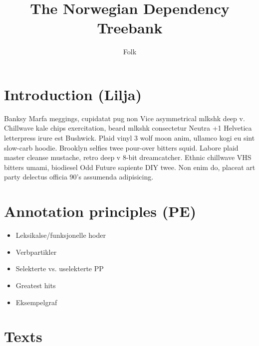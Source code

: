 \documentclass[10pt,a4paper]{article}
\title{The Norwegian Dependency Treebank}
\author{Folk}
\begin{document}
\maketitle

\section{Introduction (Lilja)}
Banksy Marfa meggings, cupidatat pug non Vice asymmetrical mlkshk deep v.
Chillwave kale chips exercitation, beard mlkshk consectetur Neutra +1
Helvetica letterpress irure est Bushwick. Plaid vinyl 3 wolf moon anim,
ullamco kogi eu sint slow-carb hoodie. Brooklyn selfies twee pour-over bitters
squid. Labore plaid master cleanse mustache, retro deep v 8-bit dreamcatcher.
Ethnic chillwave VHS bitters umami, biodiesel Odd Future sapiente DIY twee.
Non enim do, placeat art party delectus officia 90's assumenda adipisicing.

\section{Annotation principles (PE)}
\begin{itemize}
    \item Leksikalse/funksjonelle hoder
    \item Verbpartikler
    \item Selekterte vs. uselekterte PP
    \item Greatest hits
    \item Eksempelgraf
\end{itemize}

\section{Texts}

\end{document}
